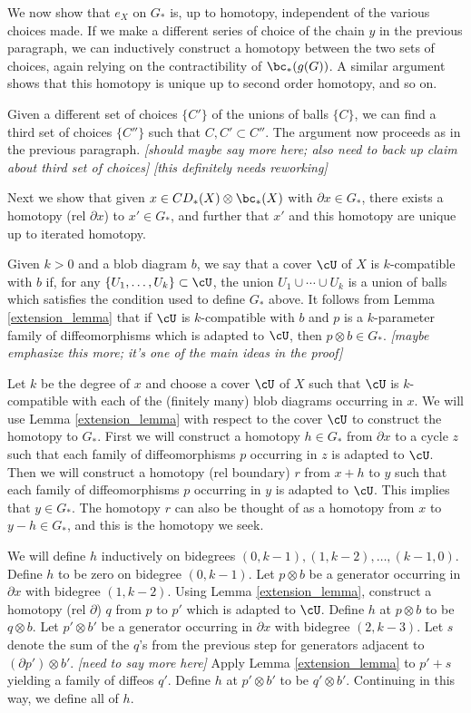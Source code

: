 \documentclass[11pt,leqno]{amsart}
\def\bd{\partial}
\def\sub{\subset}
\def\nn#1{{{\it \small [#1]}}}
\begin{document}
We now show that $e_X$ on $G_*$ is, up to homotopy, independent of the various choices made.
If we make a different series of choice of the chain $y$ in the previous paragraph,
we can inductively construct a homotopy between the two sets of choices,
again relying on the contractibility of $\bc_*(g(G))$.
A similar argument shows that this homotopy is unique up to second order homotopy, and so on.

Given a different set of choices $\{C'\}$ of the unions of balls $\{C\}$,
we can find a third set of choices $\{C''\}$ such that $C, C' \sub C''$.
The argument now proceeds as in the previous paragraph.
\nn{should maybe say more here; also need to back up claim about third set of choices}
\nn{this definitely needs reworking}

Next we show that given $x \in CD_*(X) \otimes \bc_*(X)$ with $\bd x \in G_*$, there exists
a homotopy (rel $\bd x$) to $x' \in G_*$, and further that $x'$ and
this homotopy are unique up to iterated homotopy.

Given $k>0$ and a blob diagram $b$, we say that a cover $\cU$ of $X$ is $k$-compatible with
$b$ if, for any $\{U_1, \ldots, U_k\} \sub \cU$, the union
$U_1\cup\cdots\cup U_k$ is a union of balls which satisfies the condition used to define $G_*$ above.
It follows from Lemma \ref{extension_lemma}
that if $\cU$ is $k$-compatible with $b$ and
$p$ is a $k$-parameter family of diffeomorphisms which is adapted to $\cU$, then
$p\otimes b \in G_*$.
\nn{maybe emphasize this more; it's one of the main ideas in the proof}

Let $k$ be the degree of $x$ and choose a cover $\cU$ of $X$ such that $\cU$ is
$k$-compatible with each of the (finitely many) blob diagrams occurring in $x$.
We will use Lemma \ref{extension_lemma} with respect to the cover $\cU$ to
construct the homotopy to $G_*$.
First we will construct a homotopy $h \in G_*$ from $\bd x$ to a cycle $z$ such that
each family of diffeomorphisms $p$ occurring in $z$ is adapted to $\cU$.
Then we will construct a homotopy (rel boundary) $r$ from $x + h$ to $y$ such that
each family of diffeomorphisms $p$ occurring in $y$ is adapted to $\cU$.
This implies that $y \in G_*$.
The homotopy $r$ can also be thought of as a homotopy from $x$ to $y-h \in G_*$, and this is the homotopy we seek.

We will define $h$ inductively on bidegrees $(0, k-1), (1, k-2), \ldots, (k-1, 0)$.
Define $h$ to be zero on bidegree $(0, k-1)$.
Let $p\otimes b$ be a generator occurring in $\bd x$ with bidegree $(1, k-2)$.
Using Lemma \ref{extension_lemma}, construct a homotopy (rel $\bd$) $q$ from $p$ to $p'$ which is adapted to $\cU$.
Define $h$ at $p\otimes b$ to be $q\otimes b$.
Let $p'\otimes b'$ be a generator occurring in $\bd x$ with bidegree $(2, k-3)$.
Let $s$ denote the sum of the $q$'s from the previous step for generators
adjacent to $(\bd p')\otimes b'$.
\nn{need to say more here}
Apply Lemma \ref{extension_lemma} to $p'+s$
yielding a family of diffeos $q'$.
Define $h$ at $p'\otimes b'$ to be $q'\otimes b'$.
Continuing in this way, we define all of $h$.
\end{document}
